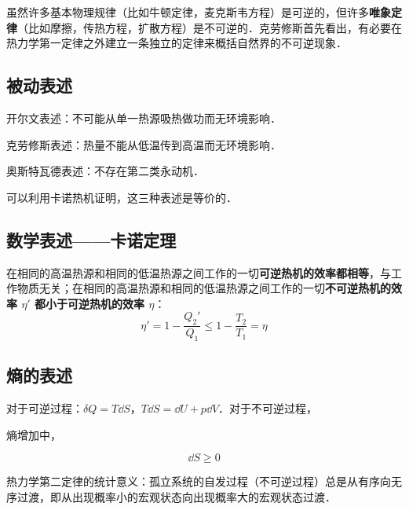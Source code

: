 
\begin{issues}
\issueDraft
\end{issues}


虽然许多基本物理规律（比如牛顿定律，麦克斯韦方程）是可逆的，但许多\textbf{唯象定律}（比如摩擦，传热方程，扩散方程）是不可逆的．克劳修斯首先看出，有必要在热力学第一定律之外建立一条独立的定律来概括自然界的不可逆现象．

\subsection{被动表述}
开尔文表述：不可能从单一热源吸热做功而无环境影响．

克劳修斯表述：热量不能从低温传到高温而无环境影响．

奥斯特瓦德表述：不存在第二类永动机．

可以利用卡诺热机证明，这三种表述是等价的．

\subsection{数学表述——卡诺定理}

在相同的高温热源和相同的低温热源之间工作的一切\textbf{可逆热机的效率都相等}，与工作物质无关；在相同的高温热源和相同的低温热源之间工作的一切\textbf{不可逆热机的效率 $\eta'$ 都小于可逆热机的效率 $\eta$}：
\begin{equation}
\eta'=1-\frac{Q_2'}{Q_1}\le 1-\frac{T_2}{T_1}=\eta
\end{equation}

\subsection{熵的表述}

对于可逆过程：$\delta Q=T\dd S$，$T\dd S=\dd U+p\dd V$．对于不可逆过程，

熵增加中，

\begin{equation}
\dd S\ge 0
\end{equation}

热力学第二定律的统计意义：孤立系统的自发过程（不可逆过程）总是从有序向无序过渡，即从出现概率小的宏观状态向出现概率大的宏观状态过渡．